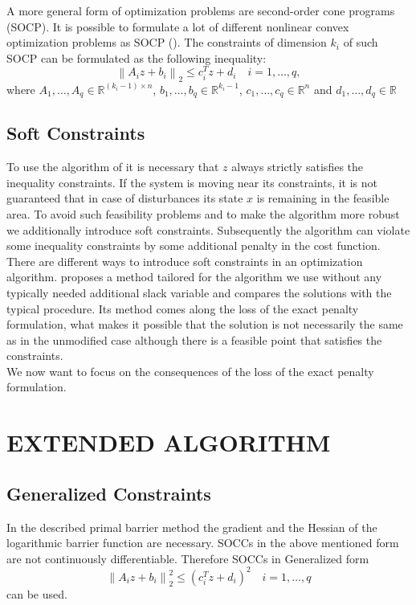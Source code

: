 \documentclass[letterpaper, 10 pt, conference]{ieeeconf}  %
\begin{document}
A more general form of optimization problems are second-order cone programs (SOCP). It is possible to formulate a lot of different nonlinear convex optimization problems as SOCP (\cite{c7}). The constraints of dimension $k_{i}$ of such SOCP can be formulated as the following
inequality:
\begin{equation*}
 \left \|A_{i}z+b_{i}  \right \|_{2} \leq c_{i}^{T}z+d_{i}\quad i=1, \dots, q,
\end{equation*}
where $A_{1},\dots,A_{q} \in \mathbb{R}^{(k_{i}-1)\times n}$, $b_{1},\dots,b_{q} \in \mathbb{R}^{k_{i}-1}$, $c_{1},\dots,c_{q} \in \mathbb{R}^{n}$ and $d_{1},\dots,d_{q} \in \mathbb{R}$

\subsection{Soft Constraints}

To use the algorithm of \cite{c1} it is necessary that $z$ always strictly satisfies the inequality constraints. If the system is moving near its constraints, it is not guaranteed that in case of disturbances its state $x$ is remaining in the feasible area. To avoid such feasibility problems and to make the algorithm more robust we additionally introduce soft constraints. Subsequently the algorithm can violate some inequality constraints by some additional penalty in the cost function. There are different ways to introduce soft constraints in an optimization algorithm. \cite{c5} proposes a method tailored for the algorithm we use without any typically needed additional slack variable and compares the solutions with the typical procedure. Its method comes along the loss of the exact penalty formulation, what makes it possible that the solution is not necessarily the same as in the unmodified case although there is a feasible point that satisfies the constraints.\\
We now want to focus on the consequences of the loss of the exact penalty formulation.
\section{EXTENDED ALGORITHM}

\subsection{Generalized Constraints}

In the described primal barrier method the gradient and the Hessian of the logarithmic barrier function are necessary. SOCCs in the above mentioned form are not continuously differentiable. Therefore SOCCs in Generalized form \cite{c2}
\begin{equation}
\label{eq:gen_socc}
 \left \|A_{i}z+b_{i}  \right \|_{2}^2 \leq \left (c_{i}^{T}z+d_{i}  \right )^{2}\quad i=1, \dots, q
\end{equation}
can be used.
\end{document}
